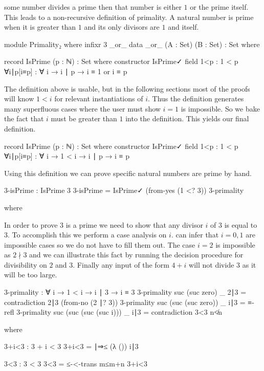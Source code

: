 \documentclass[./Thesis.tex]{subfiles}
\begin{document}
some number divides a prime then that number is either $1$ or the prime itself.
This leads to a non-recursive definition of primality. A natural number is prime
when it is greater than $1$ and its only divisors are $1$ and itself.
\begin{code}[hide]
  module Primality₂ where
    infixr 3 _or_
    data _or_ (A : Set) (B : Set) : Set where
\end{code}
\begin{code}
    record IsPrime (p : ℕ) : Set where
      constructor IsPrime✓
      field
        1<p : 1 < p
        ∀i∣p[i≡p] : ∀ {i} → i ∣ p → i ≡ 1 or i ≡ p
\end{code}
The definition above is usable, but in the following sections most of the proofs
will know $1 < i$ for relevant instantiations of $i$. Thus the definition
generates many superfluous cases where the user must show $i = 1$ is impossible.
So we bake the fact that $i$ must be greater than $1$ into the definition. This
yields our final definition.
\begin{code}
  record IsPrime (p : ℕ) : Set where
    constructor IsPrime✓
    field
      1<p : 1 < p
      ∀i∣p[i≡p] : ∀ {i} → 1 < i → i ∣ p → i ≡ p
\end{code}
Using this definition we can prove specific natural numbers are prime by hand.
\begin{code}
  3-isPrime : IsPrime 3
  3-isPrime = IsPrime✓ (from-yes (1 <? 3)) 3-primality
\end{code}
\begin{code}[hide]
    where
\end{code}
In order to prove $3$ is a prime we need to show that any divisor $i$ of $3$ is
equal to $3$. To accomplish this we perform a case analysis on $i$. \Agda{} can
infer that $i = 0, 1$ are impossible cases so we do not have to fill them out.
The case $i = 2$ is impossible as $2 \nmid 3$ and we can illustrate this fact by
running the decision procedure for divisibility on $2$ and $3$. Finally any
input of the form $4 + i$ will not divide $3$ as it will be too large.
\begin{code}
    3-primality : ∀ {i} → 1 < i → i ∣ 3 → i ≡ 3
    3-primality {suc (suc zero)} _ 2∣3 = contradiction 2∣3 (from-no (2 ∣? 3))
    3-primality {suc (suc (suc zero))} _ i∣3 = ≡-refl
    3-primality {suc (suc (suc (suc i)))} _ i∣3 = contradiction 3<3 n≮n
\end{code}
\begin{code}[hide]
      where
\end{code}
\begin{code}
      3+i<3 : 3 + i < 3
      3+i<3 = ∣⇒≤ (λ ()) i∣3

      3<3 : 3 < 3
      3<3 = ≤-<-trans m≤m+n 3+i<3
\end{code}
\end{document}
